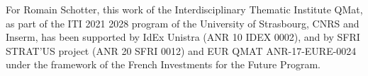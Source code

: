 

For Romain Schotter, this work of the Interdisciplinary Thematic Institute QMat, as part of the ITI 2021 2028
program of the University of Strasbourg, CNRS and Inserm, has been supported by IdEx Unistra
(ANR 10 IDEX 0002), and by SFRI STRAT’US project (ANR 20 SFRI 0012) and EUR
QMAT ANR-17-EURE-0024 under the framework of the French Investments for the Future
Program.
